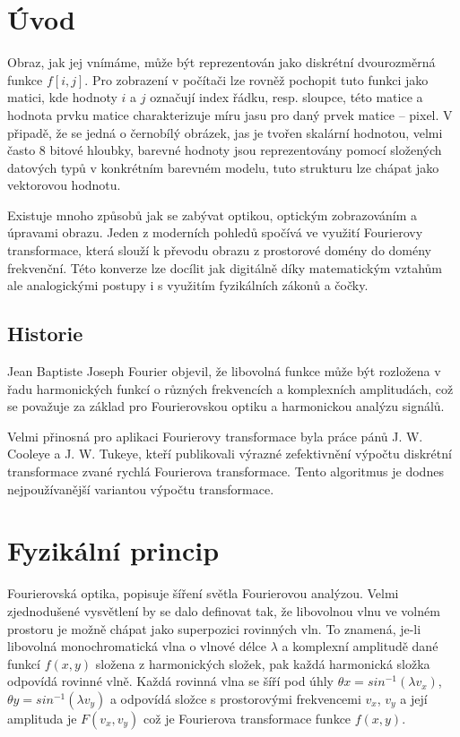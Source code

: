 \documentclass[11pt,a4paper]{article}
\newcommand{\titlepageandcontents}{
  

  \pagestyle{plain}
  \pagenumbering{roman}
  \setcounter{page}{1}

  \newpage
  \pagestyle{plain}
  \pagenumbering{arabic}
  \setcounter{page}{1}
}
\begin{document}
\titlepageandcontents
\section{Úvod}
Obraz, jak jej vnímáme, může být reprezentován jako diskrétní dvourozměrná funkce $f[i,j]$.
Pro zobrazení v počítači lze rovněž pochopit tuto funkci jako matici, kde hodnoty $i$ a $j$ 
označují index řádku, resp. sloupce, této matice a hodnota prvku matice charakterizuje míru jasu pro daný
prvek matice -- pixel. V připadě, že se jedná o černobílý obrázek, jas je tvořen skalární hodnotou, 
velmi často 8 bitové hloubky, barevné hodnoty jsou reprezentovány pomocí složených datových typů
v konkrétním barevném modelu, tuto strukturu lze chápat jako vektorovou hodnotu. 

Existuje mnoho způsobů jak se zabývat optikou, optickým zobrazováním a úpravami obrazu.
Jeden z moderních pohledů spočívá ve využití Fourierovy transformace, která slouží k převodu
obrazu z prostorové domény do domény frekvenční. Této konverze lze docílit jak digitálně
díky matematickým vztahům ale analogickými postupy i s využitím fyzikálních zákonů a čočky.

\subsection{Historie}
Jean Baptiste Joseph Fourier objevil, že libovolná funkce může být rozložena v řadu 
harmonických funkcí o různých frekvencích a komplexních amplitudách, což se považuje za základ 
pro Fourierovskou optiku a harmonickou analýzu signálů.

Velmi přinosná pro aplikaci Fourierovy transformace byla práce pánů J. W. Cooleye a J. W. Tukeye,
kteří publikovali výrazné zefektivnění výpočtu diskrétní transformace zvané rychlá Fourierova
transformace. Tento algoritmus je dodnes nejpoužívanější variantou výpočtu transformace.

\section{Fyzikální princip}
Fourierovská optika, popisuje šíření světla Fourierovou analýzou. Velmi zjednodušené vysvětlení by
se dalo definovat tak, že libovolnou vlnu ve volném prostoru je možně chápat jako superpozici rovinných 
vln. To znamená, je-li libovolná monochromatická 
vlna o vlnové délce $\lambda$ a komplexní amplitudě dané funkcí $f(x,y)$ složena z harmonických 
složek, pak každá harmonická složka odpovídá rovinné vlně. Každá rovinná vlna se šíří pod úhly 
$\theta x = sin^{-1}(\lambda v_x)$, $\theta y = sin^{-1}(\lambda v_y)$ a odpovídá složce s prostorovými 
frekvencemi $v_x$, $v_y$  a její amplituda je $F(v_x, v_y)$ což je Fourierova transformace funkce
$f(x,y)$.
\end{document}
